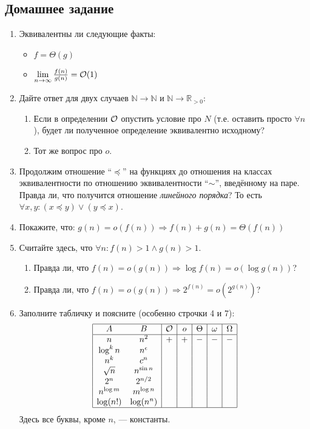 \subsection{Домашнее задание}
\begin{enumerate}
	\item	
	Эквивалентны ли следующие факты:
	\begin{itemize}
		\item $f = \Theta(g)$
		\item $\lim\limits_{n \to \infty} \frac{f(n)}{g(n)} = \mathcal{O}(1)$
	\end{itemize}

  \item
    Дайте ответ для двух случаев $\mathbb{N} \to \mathbb{N}$ и $\mathbb{N} \to \mathbb{R}_{>0}$:
    \begin{enumerate}
      \item
        Если в определении $\mathcal{O}$ опустить условие про $N$ (т.е. оставить
        просто $\forall n$), будет ли полученное определение эквивалентно
        исходному?
      \item
        Тот же вопрос про $o$.
    \end{enumerate}

  \item
    Продолжим отношение ``$\preceq$'' на функциях до отношения на классах эквивалентности по отношению эквивалентности ``$\sim$'', введённому на паре. Правда ли, что получится отношение \textit{линейного порядка}? То есть $\forall x, y: (x \preceq y) \lor  (y \preceq x)$.

  \item
    Покажите, что:  $g(n) = o(f(n)) \Rightarrow f(n) + g(n) = \Theta(f(n))$

   \item
    Считайте здесь, что $\forall n : f(n) > 1 \land g(n) > 1$.
    \begin{enumerate}
      \item Правда ли, что $f(n) = o(g(n)) \Rightarrow \log f(n) = o(\log g(n))$?
      \item Правда ли, что $f(n) = o(g(n)) \Rightarrow 2^{f(n)} = o(2^{g(n)})$?
    \end{enumerate}

  \item Заполните табличку и поясните (особенно строчки 4 и 7):
    $$
    \begin{array}{|cc|c|c|c|c|c|}
      \hline
      A & B & \mathcal{O} & o & \Theta & \omega & \Omega \\
      \hline
      n & n^2 & + & + & - & - & - \\
      \log^k n & n^{\epsilon} & & & & & \\
      n^k & c^n & & & & & \\
      \sqrt{n} & n^{\sin n} & & & & & \\
      2^n & 2^{n \slash 2} & & & & & \\
      n^{\log m} & m^{\log n} & & & & & \\
      \log (n!) & \log(n^n) & & & & & \\
      \hline
    \end{array}
    $$
    Здесь все буквы, кроме $n$, --- константы.



\end{enumerate}
